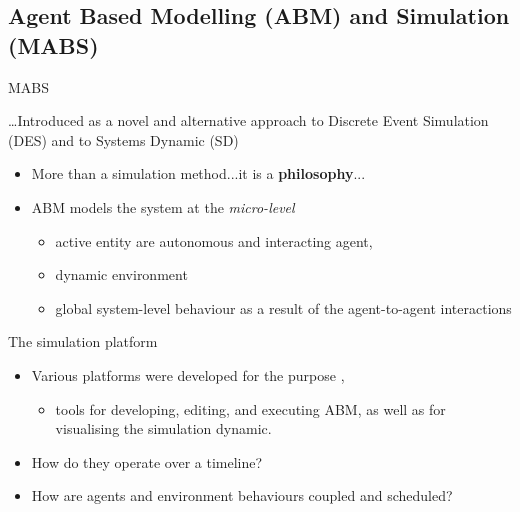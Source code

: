 \documentclass[presentation]{beamer} %
\begin{document}
\subsection{Agent Based Modelling (ABM) and Simulation (MABS)}

\begin{frame}{MABS}

\ldots Introduced as a novel and alternative approach to Discrete Event Simulation (DES) and to Systems Dynamic (SD)

\begin{block}{}
	\begin{itemize}
		\item More than a simulation method...it is a \textbf{philosophy}...    
    		\item ABM models the system at the \emph{micro-level}
		\begin{itemize}
			\item active entity are autonomous and interacting agent, 
			\item dynamic environment
			\item global system-level behaviour as a result of the agent-to-agent interactions
		\end{itemize}
	\end{itemize}
\end{block}

\begin{block}{The simulation platform}
	\begin{itemize}
		\item Various platforms were developed for the purpose \cite{simulationtoolkits-survey,Railsback:simulation2006}, 
		\begin{itemize}
			\item  tools for developing, editing, and executing ABM, as well as for visualising the simulation dynamic. 
		\end{itemize}
		\item How do they operate over a timeline?
		\item How are agents and environment behaviours coupled and scheduled?
	\end{itemize}
\end{block}


\end{frame}


\end{document}
